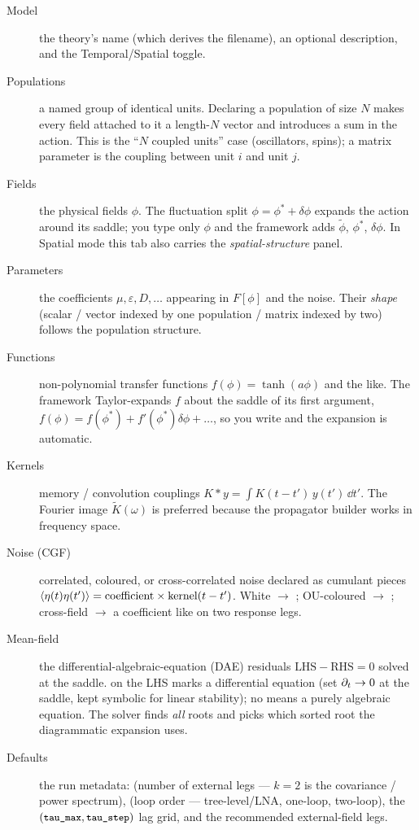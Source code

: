\begin{description}
  \item[Model] the theory's name (which derives the filename), an optional
        description, and the Temporal/Spatial toggle.
  \item[Populations] a named group of  identical units. Declaring a
        population  of size $N$ makes every field attached to it a
        length-$N$ vector and introduces a  sum in the action.
        This is the ``$N$ coupled units'' case (oscillators, spins); a matrix
        parameter  is the coupling between unit $i$ and unit $j$.
  \item[Fields] the physical fields $\phi$. The fluctuation split
        $\phi = \phi^{*} + \delta\phi$ expands the action around its saddle; you
        type only $\phi$ and the framework adds $\tilde\phi$, $\phi^{*}$,
        $\delta\phi$. In Spatial mode this tab also carries the
        \emph{spatial-structure} panel.
  \item[Parameters] the coefficients $\mu,\varepsilon,D,\dots$ appearing in
        $F[\phi]$ and the noise. Their \emph{shape} (scalar / vector indexed by
        one population / matrix indexed by two) follows the population structure.
  \item[Functions] non-polynomial transfer functions $f(\phi) = \tanh(a\phi)$ and
        the like. The framework Taylor-expands $f$ about the saddle of its first
        argument, $f(\phi) = f(\phi^{*}) + f'(\phi^{*})\delta\phi + \dots$, so you
        write  and the expansion is automatic.
  \item[Kernels] memory / convolution couplings $K * y = \int K(t-t')\,y(t')\,
        \dd t'$. The Fourier image $\tilde K(\omega)$ is preferred because the
        propagator builder works in frequency space.
  \item[Noise (CGF)] correlated, coloured, or cross-correlated noise declared as
        cumulant pieces $\left\langle \eta(t)\eta(t') \right\rangle = \text{coefficient}\times
        \text{kernel}(t-t')$. White $\to$ ; OU-coloured
        $\to$ ; cross-field $\to$ a coefficient like
         on two response legs.
  \item[Mean-field] the differential-algebraic-equation (DAE) residuals
        $\text{LHS} - \text{RHS} = 0$ solved at the saddle.  on the LHS
        marks a differential equation (set $\partial_t\to 0$ at the saddle, kept symbolic
        for linear stability); no  means a purely algebraic equation. The
        solver finds \emph{all} roots and  picks which
        sorted root the diagrammatic expansion uses.
  \item[Defaults] the run metadata:  (number of external legs --- $k=2$ is
        the covariance / power spectrum),  (loop order --- 
        tree-level/LNA,  one-loop,  two-loop), the
        $(\texttt{\small tau\_max}, \texttt{\small tau\_step})$ lag grid, and the recommended
        external-field legs.
\end{description}


